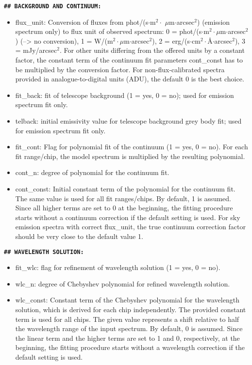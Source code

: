 {\bf\large\tt\#\# BACKGROUND AND CONTINUUM:}
\begin{itemize}
\item {\sc flux\_unit}: Conversion of fluxes from phot/(s$\cdot$m$^2\cdot$
$\mu$m$\cdot$arcsec$^2$) (emission spectrum only) to flux unit of observed
spectrum: 0 = phot/(s$\cdot$m$^2\cdot$$\mu$m$\cdot$arcsec$^2$) (--> no
conversion), 1 = W/(m$^2\cdot$$\mu$m$\cdot$arcsec$^2$),
2 = erg/(s$\cdot$cm$^2\cdot$\AA$\cdot$arcsec$^2$), 3 = mJy/arcsec$^2$.
For other units differing from the offered units by a constant factor, the
constant term of the continuum fit parameters {\sc cont\_const} has to be
multiplied by the conversion factor. For non-flux-calibrated spectra provided
in analogue-to-digital units (ADU), the default 0 is the best choice.
\item {\sc fit\_back}: fit of telescope background (1 = yes, 0 = no); used for
emission spectrum fit only.
\item {\sc telback}: initial emissivity value for telescope background grey
body fit; used for emission spectrum fit only.
\item {\sc fit\_cont}: Flag for polynomial fit of the continuum (1 = yes,
0 = no). For each fit range/chip, the model spectrum is multiplied by the
resulting polynomial.
\item {\sc cont\_n}: degree of polynomial for the continuum fit.
\item {\sc cont\_const}: Initial constant term of the polynomial for the
continuum fit. The same value is used for all fit ranges/chips. By default,
1 is assumed. Since all higher terms are set to 0 at the beginning, the fitting
procedure starts without a continuum correction if the default setting is used.
For sky emission spectra with correct {\sc flux\_unit}, the true continuum
correction factor should be very close to the default value 1.
\end{itemize}

{\bf\large\tt\#\# WAVELENGTH SOLUTION:}
\begin{itemize}
\item {\sc fit\_wlc}: flag for refinement of wavelength solution (1 = yes,
0 = no).
\item {\sc wlc\_n}: degree of Chebyshev polynomial for refined wavelength
solution.
\item {\sc wlc\_const}: Constant term of the Chebyshev polynomial for the
wavelength solution, which is derived for each chip independently. The provided
constant term is used for all chips. The given value represents a shift
relative to half the wavelength range of the input spectrum. By default,
0 is assumed. Since the linear term and the higher terms are set to 1 and 0,
respectively, at the beginning, the fitting procedure starts without a
wavelength correction if the default setting is used.
\end{itemize}

